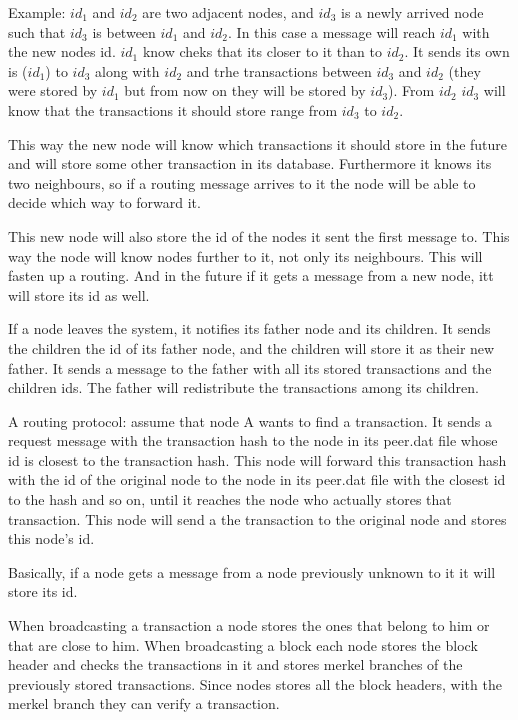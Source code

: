 \documentclass[a4paper,12pt]{article}
\begin{document}
Example: $id_1$ and $id_2$ are two adjacent nodes, and $id_3$ is a newly arrived node such that $id_3$ is between $id_1$ and $id_2$. In this case a message will reach $id_1$ with the new nodes id. $id_1$ know cheks that its closer to it than to $id_2$. It sends its own is ($id_1$) to $id_3$ along with $id_2$ and trhe transactions between $id_3$ and $id_2$ (they were stored by $id_1$ but from now on they will be stored by $id_3$). From $id_2$ $id_3$ will know that the transactions it should store range from $id_3$ to $id_2$.

This way the new node will know which transactions it should store in the future and will store some other transaction in its database. Furthermore it knows its two neighbours, so if a routing message arrives to it the node will be able to decide which way to forward it.

This new node will also store the id of the nodes it sent the first message to. This way the node will know nodes further to it, not only its neighbours. This will fasten up a routing. And in the future if it gets a message from a new node, itt will store its id as well.

If a node leaves the system, it notifies its father node and its children. It sends the children the id of its father node, and the children will store it as their new father. It sends a message to the father with all its stored transactions and the children ids. The father will redistribute the transactions among its children.


A routing protocol: assume that node A wants to find a transaction. It sends a request message with the transaction hash to the node in its peer.dat file whose id is closest to the transaction hash. This node will forward this transaction hash with the id of the original node to the node in its peer.dat file with the closest id to the hash and so on, until it reaches the node who actually stores that transaction. This node will send a the transaction to the original node and stores this node's id.

Basically, if a node gets a message from a node previously unknown to it it will store its id.

When broadcasting a transaction a node stores the ones that belong to him or that are close to him. When broadcasting a block each node stores the block header and checks the transactions in it and stores merkel branches of the previously stored transactions. Since nodes stores all the block headers, with the merkel branch they can verify a transaction.
\end{document}
